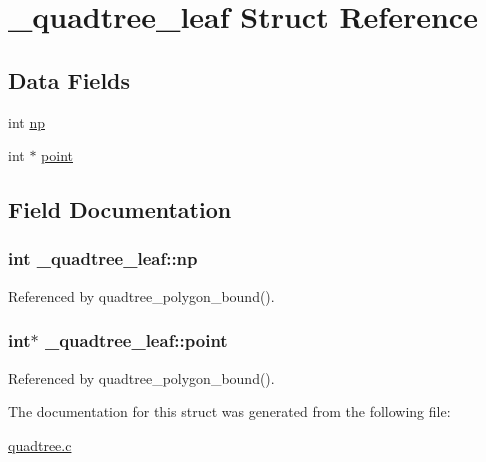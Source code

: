 \hypertarget{struct__quadtree__leaf}{}\section{\+\_\+quadtree\+\_\+leaf Struct Reference}
\label{struct__quadtree__leaf}
\subsection*{Data Fields}
\begin{DoxyCompactItemize}
\item 
int \hyperlink{struct__quadtree__leaf_ac79b446e1eb13c6e58f10261a377c59d}{np}
\item 
int $\ast$ \hyperlink{struct__quadtree__leaf_a2aacd5d8ad9b1bc3d7d0028d0f6b08a2}{point}
\end{DoxyCompactItemize}


\subsection{Field Documentation}
\subsubsection[{\texorpdfstring{np}{np}}]{\setlength{\rightskip}{0pt plus 5cm}int \+\_\+quadtree\+\_\+leaf\+::np}\hypertarget{struct__quadtree__leaf_ac79b446e1eb13c6e58f10261a377c59d}{}\label{struct__quadtree__leaf_ac79b446e1eb13c6e58f10261a377c59d}


Referenced by quadtree\+\_\+polygon\+\_\+bound().

\subsubsection[{\texorpdfstring{point}{point}}]{\setlength{\rightskip}{0pt plus 5cm}int$\ast$ \+\_\+quadtree\+\_\+leaf\+::point}\hypertarget{struct__quadtree__leaf_a2aacd5d8ad9b1bc3d7d0028d0f6b08a2}{}\label{struct__quadtree__leaf_a2aacd5d8ad9b1bc3d7d0028d0f6b08a2}


Referenced by quadtree\+\_\+polygon\+\_\+bound().



The documentation for this struct was generated from the following file\+:\begin{DoxyCompactItemize}
\item 
\hyperlink{quadtree_8c}{quadtree.\+c}\end{DoxyCompactItemize}
